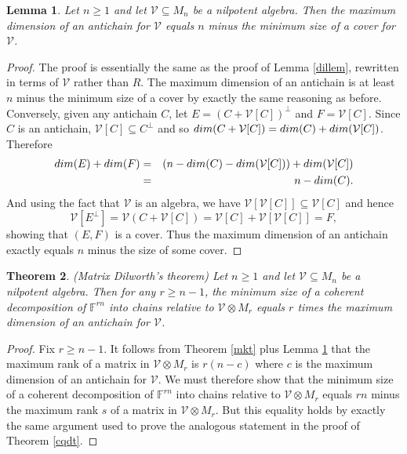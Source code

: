 \documentclass[10pt,a4paper]{amsart}
\newtheorem{thm}{Theorem}[section]
\newtheorem{lem}[thm]{Lemma}
\begin{document}
\begin{lem}\label{dillem2}
Let $n \geq 1$ and let $\mathcal{V} \subseteq M_n$ be a nilpotent algebra. Then the maximum dimension of an antichain for $\mathcal{V}$ equals $n$ minus the minimum size of a cover for $\mathcal{V}$.
\end{lem}

\begin{proof}
The proof is essentially the same as the proof of Lemma \ref{dillem}, rewritten in terms of $\mathcal{V}$ rather than $R$. The maximum dimension of an antichain is at least $n$ minus the minimum size of a cover by exactly the same reasoning as before. Conversely, given any antichain $C$, let $E = (C + \mathcal{V}[C])^\perp$ and $F = \mathcal{V}[C]$. Since $C$ is an antichain, $\mathcal{V}[C] \subseteq C^\perp$ and so ${\rm dim}(C + \mathcal{V}[C]) = {\rm dim}(C) + {\rm dim}(\mathcal{V}[C])$. Therefore \begin{eqnarray*}
{\rm dim}(E) + {\rm dim}(F) &=& (n - {\rm dim}(C) - {\rm dim}(\mathcal{V}[C])) + {\rm dim}(\mathcal{V}[C])\\ &=& n - {\rm dim}(C).
\end{eqnarray*} And using the fact that $\mathcal{V}$ is an algebra, we have $\mathcal{V}[\mathcal{V}[C]] \subseteq \mathcal{V}[C]$ and hence $$\mathcal{V}[E^\perp] = \mathcal{V}(C + \mathcal{V}[C]) = \mathcal{V}[C] + \mathcal{V}[\mathcal{V}[C]] = F,$$ showing that $(E,F)$ is a cover. Thus the maximum dimension of an antichain exactly equals $n$ minus the size of some cover.
\end{proof}

\begin{thm} (Matrix Dilworth's theorem)
Let $n \geq 1$ and let $\mathcal{V} \subseteq M_n$ be a nilpotent algebra. Then for any $r \geq n - 1$, the minimum size of a coherent decomposition of $\mathbb{F}^{rn}$ into chains relative to $\mathcal{V} \otimes M_r$ equals $r$ times the maximum dimension of an antichain for $\mathcal{V}$.
\end{thm}

\begin{proof}
Fix $r \geq n - 1$. It follows from Theorem \ref{mkt} plus Lemma \ref{dillem2} that the maximum rank of a matrix in $\mathcal{V}\otimes M_r$ is $r(n - c)$ where $c$ is the maximum dimension of an antichain for $\mathcal{V}$. We must therefore show that the minimum size of a coherent decomposition of $\mathbb{F}^{rn}$ into chains relative to $\mathcal{V} \otimes M_r$ equals $rn$ minus the maximum rank $s$ of a matrix in $\mathcal{V}\otimes M_r$. But this equality holds by exactly the same argument used to prove the analogous statement in the proof of Theorem \ref{cqdt}.
\end{proof}
\end{document}
